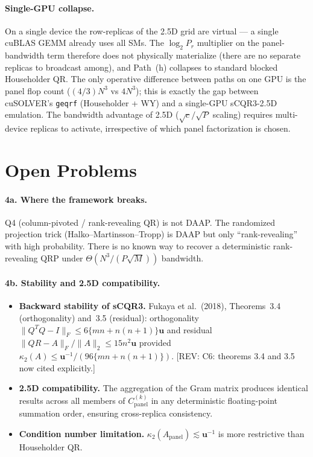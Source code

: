 \documentclass[11pt]{article}
\newcommand{\REV}[1]{\textcolor{blue!60!black}{\small\textsf{[REV: #1]}}}
\begin{document}
\paragraph{Single-GPU collapse.}
On a single device the row-replicas of the 2.5D grid are virtual --- a
single cuBLAS GEMM already uses all SMs. The $\log_2 P_r$ multiplier
on the panel-bandwidth term therefore does not physically materialize
(there are no separate replicas to broadcast among), and Path~(h)
collapses to standard blocked Householder QR. The only operative
difference between paths on one GPU is the panel flop count
($(4/3) N^3$ vs $4 N^3$); this is exactly the gap between cuSOLVER's
\texttt{geqrf} (Householder + WY) and a single-GPU sCQR3-2.5D
emulation. The bandwidth advantage of 2.5D ($\sqrt{c}/\sqrt{P}$
scaling) requires multi-device replicas to activate, irrespective of
which panel factorization is chosen.

\section{Open Problems}
\label{sec:A4}

\paragraph{4a. Where the framework breaks.}
Q4 (column-pivoted / rank-revealing QR) is not DAAP. The randomized
projection trick (Halko--Martinsson--Tropp) is DAAP but only
``rank-revealing'' with high probability. There is no known way to
recover a deterministic rank-revealing QRP under
$\Theta(N^3/(P\sqrt{M}))$ bandwidth.

\paragraph{4b. Stability and 2.5D compatibility.}
\begin{itemize}[leftmargin=2em]
  \item \textbf{Backward stability of sCQR3.} Fukaya et al.\ (2018),
    Theorems~3.4 (orthogonality) and~3.5 (residual): orthogonality
    $\|Q^T Q - I\|_F \le 6\{mn + n(n+1)\}\mathbf{u}$ and residual
    $\|QR - A\|_F/\|A\|_2 \le 15 n^2 \mathbf{u}$ provided
    $\kappa_2(A) \le \mathbf{u}^{-1}/(96\{mn + n(n+1)\})$.
    \REV{C6: theorems 3.4 and 3.5 now cited explicitly.}
  \item \textbf{2.5D compatibility.} The aggregation of the Gram matrix
    produces identical results across all members of $C^{(k)}_{\mathrm{panel}}$
    in any deterministic floating-point summation order, ensuring
    cross-replica consistency.
  \item \textbf{Condition number limitation.}
    $\kappa_2(A_{\mathrm{panel}}) \lesssim \mathbf{u}^{-1}$ is more
    restrictive than Householder QR.
\end{itemize}
\end{document}
